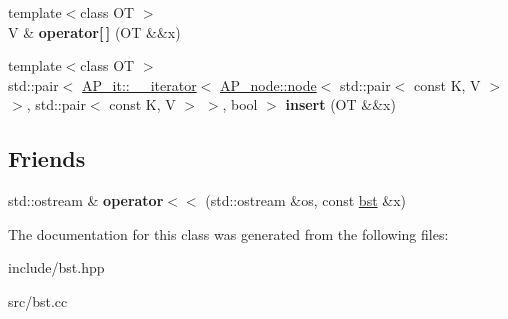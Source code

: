 \begin{DoxyCompactItemize}
{\footnotesize template$<$class OT $>$ }\\V \& {\bfseries operator\mbox{[}$\,$\mbox{]}} (OT \&\&x)
\item 
\mbox{\label{classBST_1_1bst_a83872d5db154816bff407ab1855fd293}} 
{\footnotesize template$<$class OT $>$ }\\std\+::pair$<$ \hyperlink{classAP__it_1_1____iterator}{A\+P\+\_\+it\+::\+\_\+\+\_\+iterator}$<$ \hyperlink{structAP__node_1_1node}{A\+P\+\_\+node\+::node}$<$ std\+::pair$<$ const K, V $>$ $>$, std\+::pair$<$ const K, V $>$ $>$, bool $>$ {\bfseries insert} (OT \&\&x)
\end{DoxyCompactItemize}
\subsection*{Friends}
\begin{DoxyCompactItemize}
\item 
\mbox{\label{classBST_1_1bst_ae4b7d69364fca0855f74abdcad674ebf}} 
std\+::ostream \& {\bfseries operator$<$$<$} (std\+::ostream \&os, const \hyperlink{classBST_1_1bst}{bst} \&x)
\end{DoxyCompactItemize}


The documentation for this class was generated from the following files\+:\begin{DoxyCompactItemize}
\item 
include/bst.\+hpp\item 
src/bst.\+cc\end{DoxyCompactItemize}
